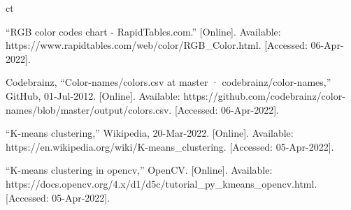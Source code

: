 ct\documentclass[a4paper,11pt]{article}
\begin{document}
\begin{thebibliography}{9}
“RGB color codes chart - RapidTables.com.” [Online]. Available: https://www.rapidtables.com/web/color/RGB\_Color.html. [Accessed: 06-Apr-2022]. 

Codebrainz, “Color-names/colors.csv at master · codebrainz/color-names,” GitHub, 01-Jul-2012. [Online]. Available: https://github.com/codebrainz/color-names/blob/master/output/colors.csv. [Accessed: 06-Apr-2022]. 

“K-means clustering,” Wikipedia, 20-Mar-2022. [Online]. Available: https://en.wikipedia.org/wiki/K-means\_clustering. [Accessed: 05-Apr-2022].

“K-means clustering in opencv,” OpenCV. [Online]. Available: https://docs.opencv.org/4.x/d1/d5c/tutorial\_py\_kmeans\_opencv.html. [Accessed: 05-Apr-2022]. 

\end{thebibliography}
\end{document}
